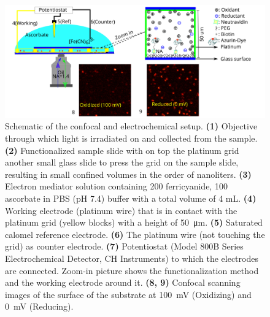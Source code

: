 \begin{figure}
	\centering
	\includegraphics[width=\textwidth]{Scheme_1_setup}
	\caption{Schematic of the confocal and electrochemical setup.
	\textbf{(1)} Objective through which light is irradiated on and collected from the sample.
	\textbf{(2)} Functionalized sample slide with on top the platinum grid another small glass slide to press the grid on the sample slide, resulting in small confined 
	volumes in the order of nanoliters.
	\textbf{(3)} Electron mediator solution containing \SI{200}{\uM} ferricyanide, \SI{100}{\uM} ascorbate in PBS (pH 7.4) buffer with a total volume of 4 mL.
	\textbf{(4)} Working electrode (platinum wire) that is in contact with the platinum grid (yellow blocks) with a height of \SI{50}{\um}.
	\textbf{(5)} Saturated calomel reference electrode.
	\textbf{(6)} The platinum wire (not touching the grid) as counter electrode.
	\textbf{(7)} Potentiostat (Model 800B Series Electrochemical Detector, CH Instruments) to which the electrodes are connected.
	Zoom-in picture shows the functionalization method and the working electrode around it. 
	\textbf{(8, 9)} Confocal scanning images of the surface of the substrate at \SI{100}{\mV} (Oxidizing) and \SI{0}{\mV} (Reducing).}
  	\label{sch:setup}
\end{figure}
